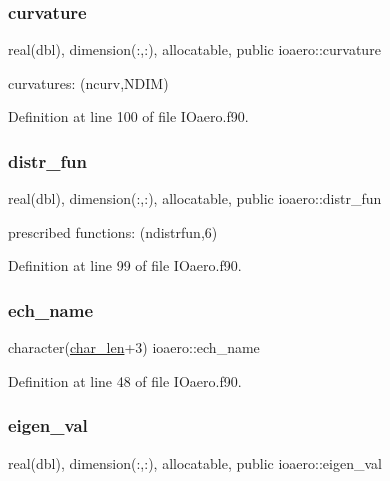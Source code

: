 \subsubsection{\texorpdfstring{curvature}{curvature}}
{\footnotesize\ttfamily real(dbl), dimension(\+:,\+:), allocatable, public ioaero\+::curvature}



curvatures\+: (ncurv,N\+D\+IM) 



Definition at line 100 of file I\+Oaero.\+f90.

\mbox{\label{namespaceioaero_a1d7c3689e30c2925cd403a84e9176242}} 
\subsubsection{\texorpdfstring{distr\+\_\+fun}{distr\_fun}}
{\footnotesize\ttfamily real(dbl), dimension(\+:,\+:), allocatable, public ioaero\+::distr\+\_\+fun}



prescribed functions\+: (ndistrfun,6) 



Definition at line 99 of file I\+Oaero.\+f90.

\mbox{\label{namespaceioaero_a175dde142a22987a0e59b9738444d2e3}} 
\subsubsection{\texorpdfstring{ech\+\_\+name}{ech\_name}}
{\footnotesize\ttfamily character(\hyperlink{namespaceioaero_acd6bdfdcfd986fd1c26261e5996e3b03}{char\+\_\+len}+3) ioaero\+::ech\+\_\+name\hspace{0.3cm}{\ttfamily [private]}}



Definition at line 48 of file I\+Oaero.\+f90.

\mbox{\label{namespaceioaero_ae043619051217506f070ece6f24deedf}} 
\subsubsection{\texorpdfstring{eigen\+\_\+val}{eigen\_val}}
{\footnotesize\ttfamily real(dbl), dimension(\+:,\+:), allocatable, public ioaero\+::eigen\+\_\+val}



